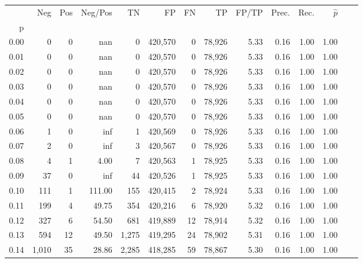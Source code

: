 \begin{tabular}{rrrrrrrrrrrrrr}
\toprule
{} &     Neg &    Pos & Neg/Pos &       TN &       FP &      FN &      TP & FP/TP & Prec. &  Rec. & $\hat{p}$ \\
p    &         &        &         &          &          &         &         &       &       &       &           \\
\midrule
0.00 &       0 &      0 &     nan &        0 &  420,570 &       0 &  78,926 &  5.33 &  0.16 &  1.00 &      1.00 \\
0.01 &       0 &      0 &     nan &        0 &  420,570 &       0 &  78,926 &  5.33 &  0.16 &  1.00 &      1.00 \\
0.02 &       0 &      0 &     nan &        0 &  420,570 &       0 &  78,926 &  5.33 &  0.16 &  1.00 &      1.00 \\
0.03 &       0 &      0 &     nan &        0 &  420,570 &       0 &  78,926 &  5.33 &  0.16 &  1.00 &      1.00 \\
0.04 &       0 &      0 &     nan &        0 &  420,570 &       0 &  78,926 &  5.33 &  0.16 &  1.00 &      1.00 \\
0.05 &       0 &      0 &     nan &        0 &  420,570 &       0 &  78,926 &  5.33 &  0.16 &  1.00 &      1.00 \\
0.06 &       1 &      0 &     inf &        1 &  420,569 &       0 &  78,926 &  5.33 &  0.16 &  1.00 &      1.00 \\
0.07 &       2 &      0 &     inf &        3 &  420,567 &       0 &  78,926 &  5.33 &  0.16 &  1.00 &      1.00 \\
0.08 &       4 &      1 &    4.00 &        7 &  420,563 &       1 &  78,925 &  5.33 &  0.16 &  1.00 &      1.00 \\
0.09 &      37 &      0 &     inf &       44 &  420,526 &       1 &  78,925 &  5.33 &  0.16 &  1.00 &      1.00 \\
0.10 &     111 &      1 &  111.00 &      155 &  420,415 &       2 &  78,924 &  5.33 &  0.16 &  1.00 &      1.00 \\
0.11 &     199 &      4 &   49.75 &      354 &  420,216 &       6 &  78,920 &  5.32 &  0.16 &  1.00 &      1.00 \\
0.12 &     327 &      6 &   54.50 &      681 &  419,889 &      12 &  78,914 &  5.32 &  0.16 &  1.00 &      1.00 \\
0.13 &     594 &     12 &   49.50 &    1,275 &  419,295 &      24 &  78,902 &  5.31 &  0.16 &  1.00 &      1.00 \\
0.14 &   1,010 &     35 &   28.86 &    2,285 &  418,285 &      59 &  78,867 &  5.30 &  0.16 &  1.00 &      1.00 \\

\end{tabular}
